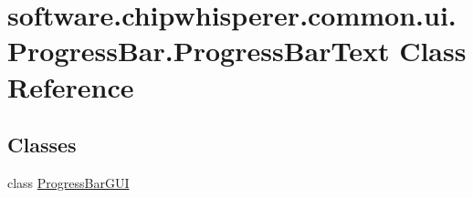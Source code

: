 \hypertarget{classsoftware_1_1chipwhisperer_1_1common_1_1ui_1_1ProgressBar_1_1ProgressBarText}{}\section{software.\+chipwhisperer.\+common.\+ui.\+Progress\+Bar.\+Progress\+Bar\+Text Class Reference}
\label{classsoftware_1_1chipwhisperer_1_1common_1_1ui_1_1ProgressBar_1_1ProgressBarText}
\subsection*{Classes}
\begin{DoxyCompactItemize}
\item 
class \hyperlink{classsoftware_1_1chipwhisperer_1_1common_1_1ui_1_1ProgressBar_1_1ProgressBarText_1_1ProgressBarGUI}{Progress\+Bar\+G\+U\+I}
\end{DoxyCompactItemize}
